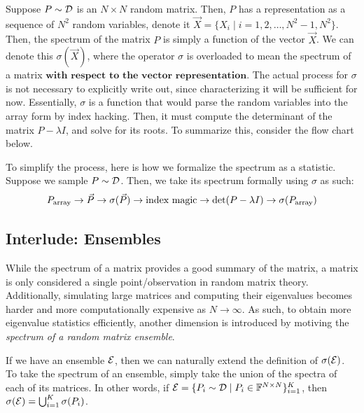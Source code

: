\begin{remark}[Formalization]
Suppose $P \sim \mathcal{D}$ is an $N \times N$ random matrix. Then, $P$ has a representation as a sequence of $N^2$ random variables, denote it $\vec{X} = \{X_i \mid i = 1,2,\dots,N^2 - 1,N^2\}$. Then, the spectrum of the matrix $P$ is simply a function of the vector $\vec{X}$. We can denote this $\sigma(\vec{X})$, where the operator $\sigma$ is overloaded to mean the spectrum of a matrix $\textbf{with respect to the vector representation}$. The actual process for $\sigma$ is not necessary to explicitly write out, since characterizing it will be sufficient for now. Essentially, $\sigma$ is a function that would parse the random variables into the array form by index hacking. Then, it must compute the determinant of the matrix $P - \lambda I$, and solve for its roots. To summarize this, consider the flow chart below.
\end{remark}

To simplify the process, here is how we formalize the spectrum as a statistic. Suppose we sample $P \sim \mathcal{D}$. Then, we take its spectrum formally using $\sigma$ as such:\hfill
$$P_{\text{array}} \rightarrow \vec{P} \rightarrow \sigma(\vec{P}) \rightarrow \text{index magic} \rightarrow \det(P - \lambda I) \rightarrow \sigma(P_{\text{array}})$$


\subsection{Interlude: Ensembles}
While the spectrum of a matrix provides a good summary of the matrix, a matrix is only considered a single point/observation in random matrix theory. Additionally, simulating large matrices and computing their eigenvalues becomes harder and more computationally expensive as $N \to \infty$. As such, to obtain more eigenvalue statistics efficiently, another dimension is introduced by motiving the \textit{spectrum of a random matrix ensemble}.

\begin{definition}
If we have an ensemble $\mathcal{E}$, then we can naturally extend the definition of $\sigma(\mathcal{E})$. To take the spectrum of an ensemble, simply take the union of the spectra of each of its matrices. In other words, if $\mathcal{E} = \{P_i \sim \mathcal{D} \mid P_i \in \mathbb{F}^{N \times N}\}_{i = 1}^K$, then $\sigma(\mathcal{E}) = \bigcup_{i=1}^K \sigma(P_i)$.
\end{definition}

